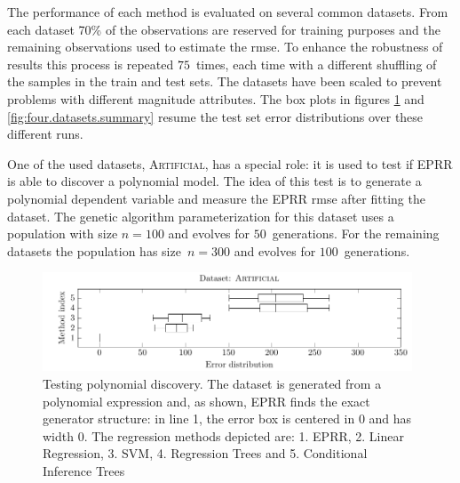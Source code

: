 \documentclass[review,preprint]{elsarticle}
\begin{document}
The performance of each method is evaluated on several common datasets. From each dataset 70\% of the observations are reserved for training purposes and the remaining observations used to estimate the \ac{rmse}. To enhance the robustness of results this process is repeated $75$~times, each time with a different shuffling of the samples in the train and test sets. The datasets have been scaled to prevent problems with different magnitude attributes. The box plots in figures \ref{artificial_dataset1_lambda1.0} and \ref{fig:four.datasets.summary} resume the test set error distributions over these different runs.

One of the used datasets, \textsc{Artificial}, has a special role: it is used to test if \ac{EPRR} is able to discover a polynomial model. The idea of this test is to generate a polynomial dependent variable and measure the \ac{EPRR} \ac{rmse} after fitting the dataset. The genetic algorithm parameterization for this dataset uses a population with size $n=100$ and evolves for $50$~generations. For the remaining datasets the population has size~$n=300$ and evolves for $100$~generations.

\begin{figure}[tb]\begin{center}
\includegraphics[width=0.98\textwidth]{figure_2.pdf}
\caption{Testing polynomial discovery. The dataset is generated from a polynomial expression and, as shown, \ac{EPRR} finds the exact generator structure: in line 1, the error box is centered in $0$ and has width $0$.  The regression methods depicted are: 1. \ac{EPRR}, 2. Linear Regression, 3. SVM, 4. Regression Trees and 5. Conditional Inference Trees}
\label{artificial_dataset1_lambda1.0}
\end{center}
\end{figure}
\end{document}
